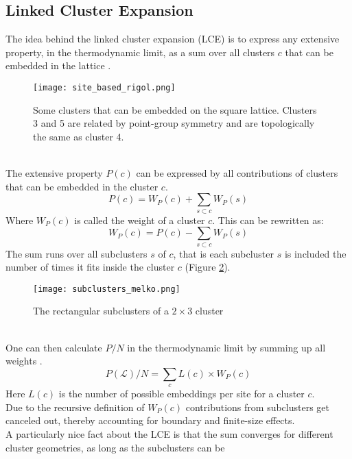 \documentclass{article}
\begin{document}
\subsection{Linked Cluster Expansion}
The idea behind the linked cluster expansion (LCE) is to
express any extensive property, in the thermodynamic limit, as a sum
over all clusters $c$ that can be embedded in the lattice
\cite{Rigol}.\\
\begin{figure}[htbp]
\centerline{\texttt{[image: site\_based\_rigol.png]}}
\caption[]{\label{fig:3} Some clusters that can be embedded on the
  square lattice. Clusters 3 and 5 are related by point-group symmetry and are topologically the same as cluster 4.}
\end{figure}\\
The extensive property $P(c)$ can be expressed by all contributions of
clusters that can be embedded in the cluster $c$.\\
\begin{equation}
\label{eq:9}
P(c) = W_P(c) + \sum\limits_{s \subset c} W_P(s)
\end{equation}
Where $W_P(c)$ is called the weight of a cluster $c$.
This can be rewritten as:
\begin{equation}
\label{eq:4}
W_P(c) = P(c) - \sum\limits_{s \subset c} W_P(s)
\end{equation}
The sum runs over all subclusters $s$ of $c$, that is each subcluster $s$ is
included the number of times it fits inside the cluster $c$ (Figure \ref{fig:sub}).\\
\begin{figure}[htbp]
\centerline{\texttt{[image: subclusters\_melko.png]}}
\caption[]{\label{fig:sub} The rectangular subclusters of a $2 \times 3$ cluster}
\end{figure}
\\
One can then calculate $P/N$ in the thermodynamic limit by summing up
all weights \cite{Rigol}.
\begin{equation}
\label{eq:3}
P(\mathcal{L})/N = \sum\limits_c L(c) \times W_P(c)
\end{equation}
Here $L(c)$ is the number of possible embeddings per site for a cluster
$c$.\\
Due to the recursive definition of $W_P(c)$ contributions from
subclusters get canceled out, thereby accounting for boundary and finite-size effects.\\
A particularly nice fact about the LCE is that the sum converges for
different cluster geometries, as long as the subclusters can be
\end{document}
